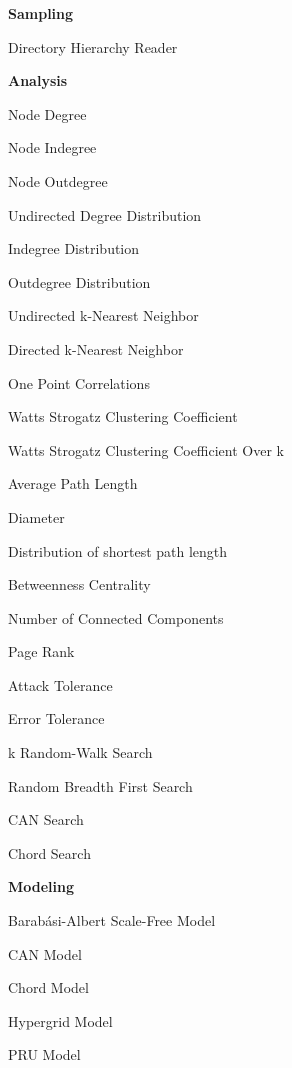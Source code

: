 \begin{multicols}{2}{
\noindent
\begin{tiny} 
\textbf{Sampling}
\begin{list}{}{\setlength{\itemindent}{-7mm}\setlength{\itemsep}{0mm}\setlength{\topsep}{1mm}}
\item Directory Hierarchy Reader
\end{list}
\textbf{ Analysis}
\begin{list}{}{\setlength{\itemindent}{-7mm}\setlength{\itemsep}{0mm}\setlength{\topsep}{1mm}}
\item Node Degree
\item Node Indegree
\item Node Outdegree
\item Undirected Degree Distribution
\item Indegree Distribution
\item Outdegree Distribution
\item Undirected k-Nearest Neighbor
\item Directed k-Nearest Neighbor
\item One Point Correlations
\item Watts Strogatz Clustering Coefficient
\item Watts Strogatz Clustering Coefficient Over k
\item Average Path Length
\item Diameter
\item Distribution of shortest path length
\item Betweenness Centrality
\item Number of Connected Components
\item Page Rank
\item Attack Tolerance
\item Error Tolerance
\item k Random-Walk Search
\item Random Breadth First Search
\item CAN Search
\item Chord Search
\end{list}
\textbf{Modeling}
\begin{list}{}{\setlength{\itemindent}{-7mm}\setlength{\itemsep}{0mm}\setlength{\topsep}{1mm}}
\item Barab\'{a}si-Albert Scale-Free Model
\item CAN Model
\item Chord Model
\item Hypergrid Model
\item PRU Model

\end{list}
\end{tiny}}
\end{multicols}
